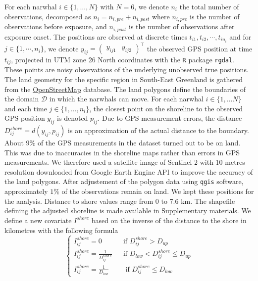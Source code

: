 \documentclass[aoas]{imsart}
\theoremstyle{definition}
\theoremstyle{remark}
\theoremstyle{remark}
\newcommand {\1}{\mathbb{1}}
\begin{document}
For each narwhal $i \in \{1,\ldots,N\}$ with $N=6$, we denote $n_i$ the total number of observations,   decomposed as $n_i=n_{i,pre}+n_{i,post}$ where $n_{i,pre}$ is the number of observations before exposure, and $n_{i,post}$ is the number of observations after exposure onset. The positions are observed at discrete times $t_{i1}, t_{i2}, \cdots,t_{in_i}$ and  for $j \in \{1,\cdots,n_i\}$, we denote $y_{ij}=\begin{pmatrix} y_{ij1} & y_{ij2} \end{pmatrix}^\top$ the observed GPS position at time $t_{ij}$, projected in UTM zone 26 North coordinates with the \texttt{R} package \texttt{rgdal}. These points are noisy observations of the underlying unobserved true positions.\\

The land geometry for the specific region in South-East Greenland is gathered from the \href{https://www.openstreetmap.org/#map=11/70.4029/-27.2928}{OpenStreetMap} database. The land polygons define the boundaries of the domain $\mathcal{D}$ in which the narwhals can move. For each narwhal $i\in\{1, \ldots N\}$ and each time $j\in\{1, \ldots, n_i\}$, the closest point on the shoreline to the observed GPS position $y_{ij}$  is denoted $p_{ij}$. Due to GPS measurement errors, the distance $D^{shore}_{ij}=d(y_{ij},p_{ij})$ is an approximation of the actual distance to the boundary. About $9\%$ of the GPS measurements in the dataset turned out to be on land. This was due  to inaccuracies in the shoreline maps rather than errors in GPS measurements. We therefore used a satellite image of Sentinel-2 with 10 metres resolution downloaded from Google Earth Engine API to improve the accuracy of the land polygons. After adjustement of the polygon data using \texttt{qgis} software,  approximately $1 \%$ of the observations remain on land. We kept these positions for the analysis. Distance to shore values range from $0$ to $7.6$ km. The shapefile defining the adjusted shoreline is made available in Supplementary materials. We define a new covariate $I^{shore}$ based on the inverse of the distance to the shore in kilometres with the following formula
\begin{equation}
	\left\{
	\begin{array}{lll}
		I^{shore}_{ij}=0 && \mbox{if } D^{shore}_{ij}>D_{up} \\
		I^{shore}_{ij}=\frac{1}{D^{shore}_{ij}} && \mbox{if } D_{low}<D^{shore}_{ij} \leq D_{up} \\
		I^{shore}_{ij}=\frac{1}{D_{low}} && \mbox{ if } D^{shore}_{ij} \leq D_{low}
	\end{array}
	\right.
	\label{eq: exp shore definition}
\end{equation}
\end{document}
